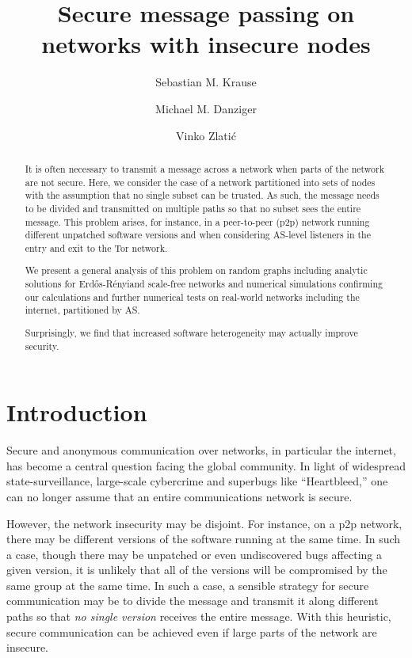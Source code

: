 \documentclass[aps, pre, twocolumn, a4paper, superscriptaddress, floatfix]{revtex4}
\newcommand{\er}{Erd\H{o}s-R\'{e}nyi}
\begin{document}
\title{Secure message passing on networks with insecure nodes}

\author{Sebastian M. Krause}
\author{Michael M. Danziger}
\author{Vinko Zlati\'{c}}
\begin{abstract}
It is often necessary to transmit a message across a network when parts of the network are not secure.
Here, we consider the case of a network partitioned into sets of nodes with the assumption that no single subset can be trusted.
As such, the message needs to be divided and transmitted on multiple paths so that no subset sees the entire message.
This problem arises, for instance, in a peer-to-peer (p2p) network running different unpatched software versions 
and when considering AS-level listeners in the entry and exit to the Tor network.

We present a general analysis of this problem on random graphs including analytic solutions for \er and scale-free networks and numerical simulations confirming our calculations and further numerical tests on real-world networks including the internet, partitioned by AS.

Surprisingly, we find that increased software heterogeneity may actually improve security.
\end{abstract}
\maketitle


\section{Introduction}

Secure and anonymous communication over networks, in particular the internet, has become a central question facing the global community.
In light of widespread state-surveillance, large-scale cybercrime and superbugs like ``Heartbleed,'' one can no longer assume that an entire communications network is secure.

However, the network insecurity may be disjoint.  
For instance, on a p2p network, there may be different versions of the software running at the same time.  
In such a case, though there may be unpatched or even undiscovered bugs affecting a given version, it is unlikely that all of the versions will be compromised by the same group at the same time.
In such a case, a sensible strategy for secure communication may be to divide the message and transmit it along different paths so that \textit{no single version} receives the entire message.
With this heuristic, secure communication can be achieved even if large parts of the network are insecure.
\end{document}
